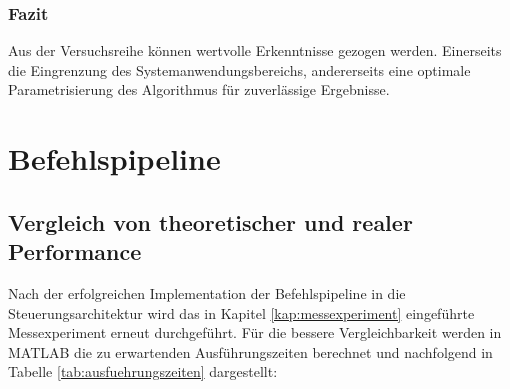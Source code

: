 \subsubsection*{Fazit}
Aus der Versuchsreihe können wertvolle Erkenntnisse gezogen werden. Einerseits die Eingrenzung des Systemanwendungsbereichs, andererseits eine optimale Parametrisierung des Algorithmus für zuverlässige Ergebnisse. 
\section{Befehlspipeline}
\label{kap:befehlspipeline}
\subsection{Vergleich von theoretischer und realer Performance}
Nach der erfolgreichen Implementation der Befehlspipeline in die Steuerungsarchitektur wird das in Kapitel \ref{kap:messexperiment} eingeführte Messexperiment erneut durchgeführt. Für die bessere Vergleichbarkeit werden in MATLAB die zu erwartenden Ausführungszeiten berechnet und nachfolgend in Tabelle \ref{tab:ausfuehrungszeiten} dargestellt:
